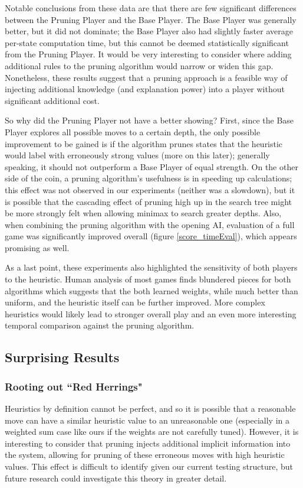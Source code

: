 \documentclass[letterpaper]{article}
\begin{document}
Notable conclusions from these data are that there are few significant differences between the Pruning Player and the Base Player.  The Base Player was generally better, but it did not dominate; the Base Player also had slightly faster average per-state computation time, but this cannot be deemed statistically significant from the Pruning Player.  It would be very interesting to consider where adding additional rules to the pruning algorithm would narrow or widen this gap.  Nonetheless, these results suggest that a pruning approach is a feasible way of injecting additional knowledge (and explanation power) into a player without significant additional cost.

So why did the Pruning Player not have a better showing?  First, since the Base Player explores all possible moves to a certain depth, the only possible improvement to be gained is if the algorithm prunes states that the heuristic would label with erroneously strong values (more on this later); generally speaking, it should not outperform a Base Player of equal strength.  On the other side of the coin, a pruning algorithm's usefulness is in speeding up calculations; this effect was not observed in our experiments (neither was a slowdown), but it is possible that the cascading effect of pruning high up in the search tree might be more strongly felt when allowing minimax to search greater depths.  Also, when combining the pruning algorithm with the opening AI, evaluation of a full game was significantly improved overall (figure \ref{score_timeEval}), which appears promising as well.

As a last point, these experiments also highlighted the sensitivity of both players to the heuristic.  Human analysis of most games finds blundered pieces for both algorithms which suggests that the both learned weights, while much better than uniform, and the heuristic itself can be further improved.  More complex heuristics would likely lead to stronger overall play and an even more interesting temporal comparison against the pruning algorithm.

\subsection{Surprising Results}
\subsubsection{Rooting out ``Red Herrings"}
Heuristics by definition cannot be perfect, and so it is possible that a reasonable move can have a similar heuristic value to an unreasonable one (especially in a weighted sum case like ours if the weights are not carefully tuned).  However, it is interesting to consider that pruning injects additional implicit information into the system, allowing for pruning of these erroneous moves with high heuristic values.  This effect is difficult to identify given our current testing structure, but future research could investigate this theory in greater detail.
\end{document}
